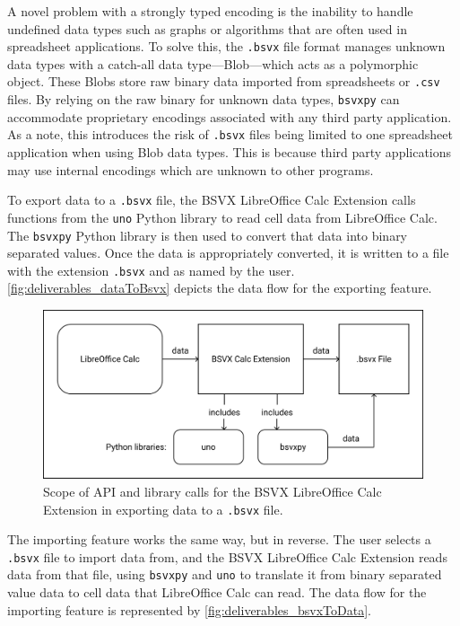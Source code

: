 \documentclass[10pt]{article}
\begin{document}
\indent{}
A novel problem with a strongly typed encoding is the inability to handle undefined data types such as graphs or algorithms that are often used in spreadsheet applications.
To solve this, the \texttt{.bsvx} file format manages unknown data types with a catch-all data type---Blob---which acts as a polymorphic object.
These Blobs store raw binary data imported from spreadsheets or \texttt{.csv} files.
By relying on the raw binary for unknown data types, \texttt{bsvxpy} can accommodate proprietary encodings associated with any third party application.
As a note, this introduces the risk of \texttt{.bsvx} files being limited to one spreadsheet application when using Blob data types.
This is because third party applications may use internal encodings which are unknown to other programs.

\indent{}
To export data to a \texttt{.bsvx} file, the BSVX LibreOffice Calc Extension calls functions from the \texttt{uno} Python library to read cell data from LibreOffice Calc.
The \texttt{bsvxpy} Python library is then used to convert that data into binary separated values.
Once the data is appropriately converted, it is written to a file with the extension \texttt{.bsvx} and as named by the user.
\autoref{fig:deliverables_dataToBsvx} depicts the data flow for the exporting feature.

\begin{figure}[H]
\centering
\includegraphics[width=5in]{figures/dataToBsvx.png}
\caption{Scope of API and library calls for the BSVX LibreOffice Calc Extension in exporting data to a \texttt{.bsvx} file.}
\label{fig:deliverables_dataToBsvx}
\end{figure}

\indent{}
The importing feature works the same way, but in reverse.
The user selects a \texttt{.bsvx} file to import data from, and the BSVX LibreOffice Calc Extension reads data from that file, using \texttt{bsvxpy} and \texttt{uno} to translate it from binary separated value data to cell data that LibreOffice Calc can read.
The data flow for the importing feature is represented by \autoref{fig:deliverables_bsvxToData}.
    
\end{document}
